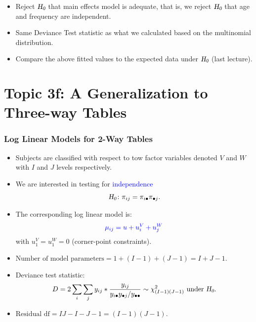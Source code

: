 \documentclass[oneside]{book}\usepackage[]{graphicx}\usepackage[svgnames]{xcolor}
\let\log\relax%
\newcommand{\HN}{\textsl{H}_{\textsl{0}}}%
\begin{document}
\begin{itemize}
      \item Reject $ \HN $ that main effects model is adequate, that is, we reject $ \HN $
            that age and frequency are independent.
      \item Same Deviance Test statistic as what we calculated based on the multinomial
            distribution.
      \item Compare the above fitted values to the expected data under $ \HN $ (last lecture).
\end{itemize}

\section*{Topic 3f: A Generalization to Three-way Tables}
\subsubsection*{Log Linear Models for 2-Way Tables}
\begin{itemize}
      \item Subjects are classified with respect to tow factor variables denoted $V$ and $W$ with
            $I$ and $J$ levels respectively.
      \item We are interested in testing for \textcolor{Blue}{independence}
            \[ \HN\colon \pi_{ij}=\pi_{i\bullet}\pi_{\bullet j}. \]
      \item The corresponding log linear model is:
            \[ \textcolor{Blue}{\log{\mu_{ij}}=u+u_i^V+u_j^W} \]
            with $ u_1^V=u_1^W=0 $ (corner-point constraints).
      \item $ \text{Number of model parameters}=1+(I-1)+(J-1)=I+J-1 $.
      \item Deviance test statistic:
            \[ D=2\sum_i\sum_j y_{ij}\log*{\frac{y_{ij}}{y_{i\bullet}y_{\bullet j}/y_{\bullet\bullet}}} \sim \chi^2_{(I-1)(J-1)}\text{ under $ \HN $}. \]
      \item $ \text{Residual df}=IJ-I-J-1=(I-1)(J-1) $.
\end{itemize}
\end{document}
